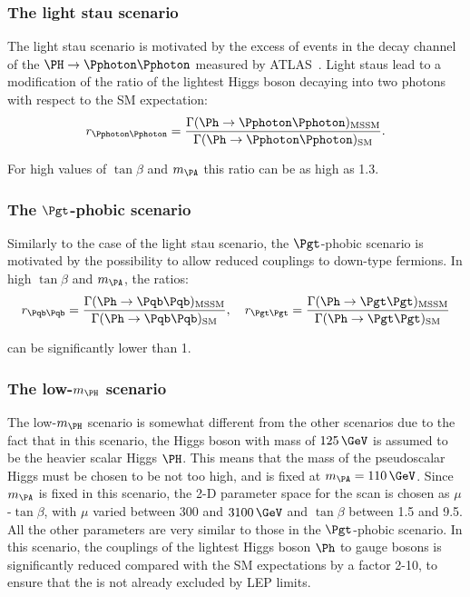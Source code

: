 \subsubsection{The light stau scenario}
\label{sec:lightstauscenario}

The light stau scenario is motivated by the excess of events in the decay
channel of the $\PH\to\Pphoton\Pphoton$ measured by ATLAS~\cite{ATLAS-CONF-2013-012}. 
Light staus lead to a modification of the ratio of the lightest Higgs boson decaying into
two photons with respect to the \ac{SM} expectation:
\begin{equation}
r_{\Pphoton\Pphoton} =
\frac{\Gamma(\Ph\to\Pphoton\Pphoton)_{\text{MSSM}}}{\Gamma(\Ph\to\Pphoton\Pphoton)_{\text{SM}}}
.
\end{equation}

For high values of $\tan\beta$ and $m_{\PA}$ this ratio can be as high as 1.3. 

\subsubsection{The $\Pgt$-phobic scenario}
\label{sec:tauphobicscenario}

Similarly to the case of the light stau scenario, the $\Pgt$-phobic scenario is
motivated by the possibility to allow reduced couplings to down-type fermions.
In high $\tan\beta$ and $m_{\PA}$, the ratios:
\begin{equation}
r_{\Pqb\Pqb} =
\frac{\Gamma(\Ph\to\Pqb\Pqb)_{\text{MSSM}}}{\Gamma(\Ph\to\Pqb\Pqb)_{\text{SM}}}
, \quad
r_{\Pgt\Pgt} =
\frac{\Gamma(\Ph\to\Pgt\Pgt)_{\text{MSSM}}}{\Gamma(\Ph\to\Pgt\Pgt)_{\text{SM}}}
\end{equation}

can be significantly lower than 1.

\subsubsection{The low-$m_{\PH}$ scenario}
\label{sec:lowmHscenario}

The low-$m_{\PH}$ scenario is somewhat different from the other scenarios due to
the fact that in this scenario, the Higgs boson with mass of $125\,\GeV$ is
assumed to be the heavier scalar Higgs $\PH$. This means that the mass of the
pseudoscalar Higgs must be chosen to be not too high, and is fixed at $m_{\PA} =
110\,\GeV$. Since $m_{\PA}$ is fixed in this scenario, the 2-D parameter space
for the scan is chosen as $\mu$-$\tan\beta$, with $\mu$ varied between 300 and
$3100\,\GeV$ and $\tan\beta$ between 1.5 and 9.5. All the other parameters are
very similar to those in the $\Pgt$-phobic scenario. In this scenario, the
couplings of the lightest Higgs boson $\Ph$ to gauge bosons is significantly
reduced compared with the \ac{SM} expectations by a factor 2-10, to ensure that
the \Ph is not already excluded by LEP limits. 

